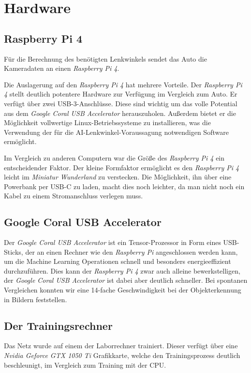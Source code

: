 \documentclass[a4paper, 12pt]{scrartcl}
\begin{document}
	

	\section{Hardware}
		\subsection{Raspberry Pi 4}
		Für die Berechnung des benötigten Lenkwinkels sendet das Auto die Kameradaten an einen \emph{Raspberry Pi 4}. 
		
		Die Auslagerung auf den \emph{Raspberry Pi 4} hat mehrere Vorteile. Der \emph{Raspberry Pi 4} stellt deutlich potentere Hardware zur Verfügung im Vergleich zum Auto. Er verfügt über zwei USB-3-Anschlüsse. Diese sind wichtig um das volle Potential aus dem \emph{Google Coral USB Accelerator} herauszuholen. Außerdem bietet er die Möglichkeit vollwertige Linux-Betriebssysteme zu installieren, was die Verwendung der für die AI-Lenkwinkel-Voraussagung notwendigen Software ermöglicht.
		
		Im Vergleich zu anderen Computern war die Größe des \emph{Raspberry Pi 4} ein entscheidender Faktor. Der kleine Formfaktor ermöglicht es den \emph{Raspberry Pi 4} leicht im \emph{Miniatur Wunderland} zu verstecken. Die Möglichkeit, ihn über eine Powerbank per USB-C zu laden, macht dies noch leichter, da man nicht noch ein Kabel zu einem Stromanschluss verlegen muss.
		
		
		\subsection{Google Coral USB Accelerator}
		Der \emph{Google Coral USB Accelerator} ist ein Tensor-Prozessor in Form eines USB-Sticks, der an einen Rechner wie den \emph{Raspberry Pi} angeschlossen werden kann, um die Machine Learning Operationen schnell und besonders energieeffizient durchzuführen. Dies kann der \emph{Raspberry Pi 4} zwar auch alleine bewerkstelligen, der \emph{Google Coral USB Accelerator} ist dabei aber deutlich schneller. Bei spontanen Vergleichen konnten wir eine 14-fache Geschwindigkeit bei der Objekterkennung in Bildern feststellen.

	
		\subsection{Der Trainingsrechner}
		Das Netz wurde auf einem der Laborrechner trainiert. Dieser verfügt über eine \emph{Nvidia Geforce GTX 1050 Ti} Grafikkarte, welche den Trainingsprozess deutlich beschleunigt, im Vergleich zum Training mit der CPU.	
	
\end{document}
